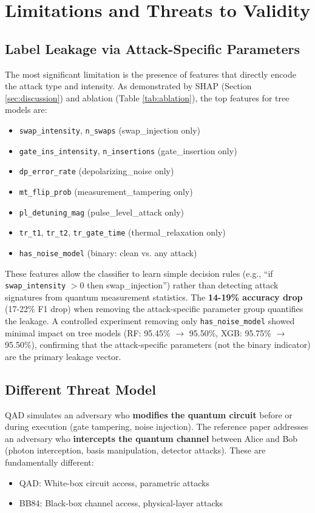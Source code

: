 \section{Limitations and Threats to Validity}
\label{sec:limitations}

\subsection{Label Leakage via Attack-Specific Parameters}
\label{sec:leakage}
The most significant limitation is the presence of features that directly encode the attack type and intensity. As demonstrated by SHAP (Section \ref{sec:discussion}) and ablation (Table \ref{tab:ablation}), the top features for tree models are:
\begin{itemize}
    \item \texttt{swap\_intensity}, \texttt{n\_swaps} (swap\_injection only)
    \item \texttt{gate\_ins\_intensity}, \texttt{n\_insertions} (gate\_insertion only)
    \item \texttt{dp\_error\_rate} (depolarizing\_noise only)
    \item \texttt{mt\_flip\_prob} (measurement\_tampering only)
    \item \texttt{pl\_detuning\_mag} (pulse\_level\_attack only)
    \item \texttt{tr\_t1}, \texttt{tr\_t2}, \texttt{tr\_gate\_time} (thermal\_relaxation only)
    \item \texttt{has\_noise\_model} (binary: clean vs. any attack)
\end{itemize}

These features allow the classifier to learn simple decision rules (e.g., ``if \texttt{swap\_intensity} $> 0$ then swap\_injection'') rather than detecting attack signatures from quantum measurement statistics. The \textbf{14-19\% accuracy drop} (17-22\% F1 drop) when removing the attack-specific parameter group quantifies the leakage. A controlled experiment removing only \texttt{has\_noise\_model} showed minimal impact on tree models (RF: 95.45\% $\to$ 95.50\%, XGB: 95.75\% $\to$ 95.50\%), confirming that the attack-specific parameters (not the binary indicator) are the primary leakage vector.

\subsection{Different Threat Model}
QAD simulates an adversary who \textbf{modifies the quantum circuit} before or during execution (gate tampering, noise injection). The reference paper addresses an adversary who \textbf{intercepts the quantum channel} between Alice and Bob (photon interception, basis manipulation, detector attacks). These are fundamentally different:
\begin{itemize}
    \item QAD: White-box circuit access, parametric attacks
    \item BB84: Black-box channel access, physical-layer attacks
\end{itemize}

